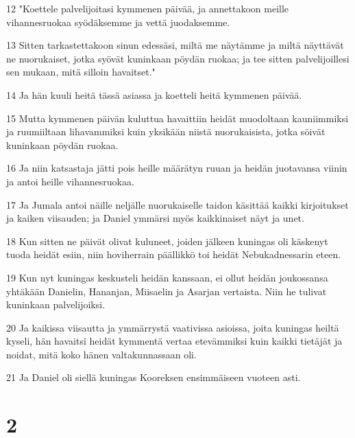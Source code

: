 \par 12 "Koettele palvelijoitasi kymmenen päivää, ja annettakoon meille vihannesruokaa syödäksemme ja vettä juodaksemme.
\par 13 Sitten tarkastettakoon sinun edessäsi, miltä me näytämme ja miltä näyttävät ne nuorukaiset, jotka syövät kuninkaan pöydän ruokaa; ja tee sitten palvelijoillesi sen mukaan, mitä silloin havaitset."
\par 14 Ja hän kuuli heitä tässä asiassa ja koetteli heitä kymmenen päivää.
\par 15 Mutta kymmenen päivän kuluttua havaittiin heidät muodoltaan kauniimmiksi ja ruumiiltaan lihavammiksi kuin yksikään niistä nuorukaisista, jotka söivät kuninkaan pöydän ruokaa.
\par 16 Ja niin katsastaja jätti pois heille määrätyn ruuan ja heidän juotavansa viinin ja antoi heille vihannesruokaa.
\par 17 Ja Jumala antoi näille neljälle nuorukaiselle taidon käsittää kaikki kirjoitukset ja kaiken viisauden; ja Daniel ymmärsi myös kaikkinaiset näyt ja unet.
\par 18 Kun sitten ne päivät olivat kuluneet, joiden jälkeen kuningas oli käskenyt tuoda heidät esiin, niin hoviherrain päällikkö toi heidät Nebukadnessarin eteen.
\par 19 Kun nyt kuningas keskusteli heidän kanssaan, ei ollut heidän joukossansa yhtäkään Danielin, Hananjan, Miisaelin ja Asarjan vertaista. Niin he tulivat kuninkaan palvelijoiksi.
\par 20 Ja kaikissa viisautta ja ymmärrystä vaativissa asioissa, joita kuningas heiltä kyseli, hän havaitsi heidät kymmentä vertaa etevämmiksi kuin kaikki tietäjät ja noidat, mitä koko hänen valtakunnassaan oli.
\par 21 Ja Daniel oli siellä kuningas Kooreksen ensimmäiseen vuoteen asti.

\chapter{2}

